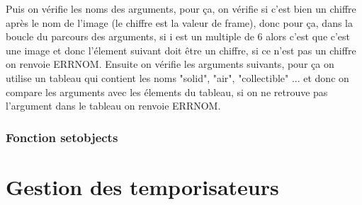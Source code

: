 \documentclass[10pt,a4paper]{article}
\begin{document}
            Puis on vérifie les noms des arguments, pour ça, on vérifie si c'est bien un chiffre après le nom de l'image (le chiffre est la valeur de frame), donc pour ça, dans la boucle du parcours des arguments, si i est un multiple de 6 alors c'est que c'est une image et donc l'élement suivant doit être un chiffre, si ce n'est pas un chiffre on renvoie ERRNOM.
            Ensuite on vérifie les arguments suivants, pour ça on utilise un tableau qui contient les noms "solid", "air", "collectible" ... et donc on compare les arguments avec les élements du tableau, si on ne retrouve pas l'argument dans le tableau on renvoie ERRNOM.
            
        \subsubsection{Fonction setobjects}
            
        
    
    
\section{Gestion des temporisateurs}
\end{document}

